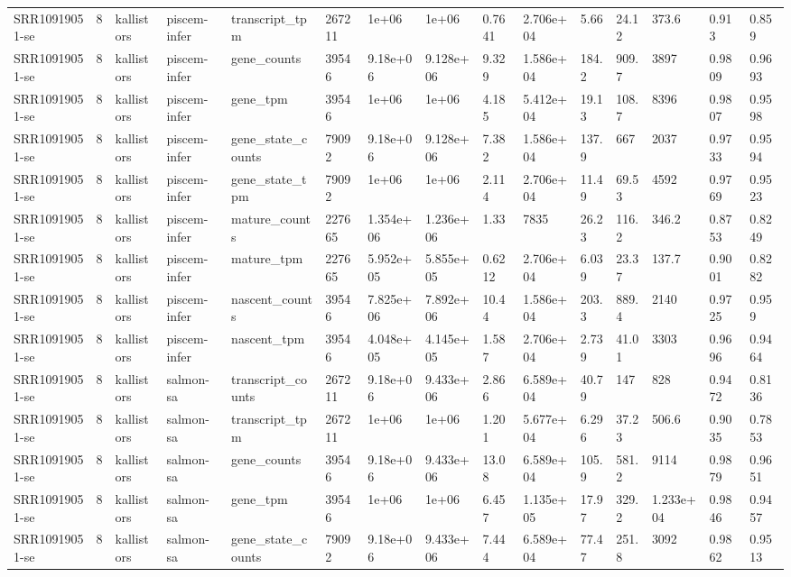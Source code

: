 \begin{tabular}{lllllllllllllll}
SRR10919051-se & 8 & kallistors & piscem-infer & transcript\_tpm & 267211 & 1e+06 & 1e+06 & 0.7641 & 2.706e+04 & 5.66 & 24.12 & 373.6 & 0.913 & 0.859 \\
SRR10919051-se & 8 & kallistors & piscem-infer & gene\_counts & 39546 & 9.18e+06 & 9.128e+06 & 9.329 & 1.586e+04 & 184.2 & 909.7 & 3897 & 0.9809 & 0.9693 \\
SRR10919051-se & 8 & kallistors & piscem-infer & gene\_tpm & 39546 & 1e+06 & 1e+06 & 4.185 & 5.412e+04 & 19.13 & 108.7 & 8396 & 0.9807 & 0.9598 \\
SRR10919051-se & 8 & kallistors & piscem-infer & gene\_state\_counts & 79092 & 9.18e+06 & 9.128e+06 & 7.382 & 1.586e+04 & 137.9 & 667 & 2037 & 0.9733 & 0.9594 \\
SRR10919051-se & 8 & kallistors & piscem-infer & gene\_state\_tpm & 79092 & 1e+06 & 1e+06 & 2.114 & 2.706e+04 & 11.49 & 69.53 & 4592 & 0.9769 & 0.9523 \\
SRR10919051-se & 8 & kallistors & piscem-infer & mature\_counts & 227665 & 1.354e+06 & 1.236e+06 & 1.33 & 7835 & 26.23 & 116.2 & 346.2 & 0.8753 & 0.8249 \\
SRR10919051-se & 8 & kallistors & piscem-infer & mature\_tpm & 227665 & 5.952e+05 & 5.855e+05 & 0.6212 & 2.706e+04 & 6.039 & 23.37 & 137.7 & 0.9001 & 0.8282 \\
SRR10919051-se & 8 & kallistors & piscem-infer & nascent\_counts & 39546 & 7.825e+06 & 7.892e+06 & 10.44 & 1.586e+04 & 203.3 & 889.4 & 2140 & 0.9725 & 0.959 \\
SRR10919051-se & 8 & kallistors & piscem-infer & nascent\_tpm & 39546 & 4.048e+05 & 4.145e+05 & 1.587 & 2.706e+04 & 2.739 & 41.01 & 3303 & 0.9696 & 0.9464 \\
SRR10919051-se & 8 & kallistors & salmon-sa & transcript\_counts & 267211 & 9.18e+06 & 9.433e+06 & 2.866 & 6.589e+04 & 40.79 & 147 & 828 & 0.9472 & 0.8136 \\
SRR10919051-se & 8 & kallistors & salmon-sa & transcript\_tpm & 267211 & 1e+06 & 1e+06 & 1.201 & 5.677e+04 & 6.296 & 37.23 & 506.6 & 0.9035 & 0.7853 \\
SRR10919051-se & 8 & kallistors & salmon-sa & gene\_counts & 39546 & 9.18e+06 & 9.433e+06 & 13.08 & 6.589e+04 & 105.9 & 581.2 & 9114 & 0.9879 & 0.9651 \\
SRR10919051-se & 8 & kallistors & salmon-sa & gene\_tpm & 39546 & 1e+06 & 1e+06 & 6.457 & 1.135e+05 & 17.97 & 329.2 & 1.233e+04 & 0.9846 & 0.9457 \\
SRR10919051-se & 8 & kallistors & salmon-sa & gene\_state\_counts & 79092 & 9.18e+06 & 9.433e+06 & 7.444 & 6.589e+04 & 77.47 & 251.8 & 3092 & 0.9862 & 0.9513 \\

\end{tabular}
